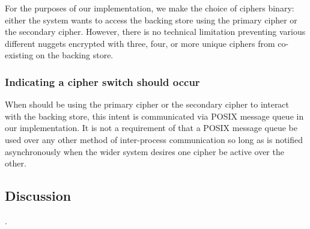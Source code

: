 For the purposes of our implementation, we make the choice of ciphers binary:
either the system wants \SYSTEM{} to access the backing store using the primary
cipher or the secondary cipher. However, there is no technical limitation
preventing various different nuggets encrypted with three, four, or more unique
ciphers from co-existing on the backing store.

\subsubsection{Indicating a cipher switch should occur}

When \SYSTEM{} should be using the primary cipher or the secondary cipher to
interact with the backing store, this intent is communicated via POSIX message
queue in our implementation. It is not a requirement of \SYSTEM{} that a POSIX
message queue be used over any other method of inter-process communication so
long as \SYSTEM{} is notified asynchronously when the wider system desires one
cipher be active over the other.

\subsection{Discussion}

.



